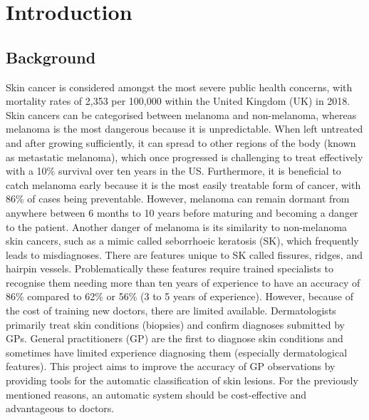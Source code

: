 

\cleardoublepage

\chapter{Introduction}

\section{Background}
Skin cancer is considered amongst the most severe public health concerns, with mortality rates of 2,353 per 100,000 within the United Kingdom (UK) in 2018\cite{UK2019}. Skin cancers can be categorised between melanoma and non-melanoma, whereas melanoma is the most dangerous because it is unpredictable. When left untreated and after growing sufficiently, it can spread to other regions of the body (known as metastatic melanoma), which once progressed is challenging to treat effectively with a 10\% survival over ten years in the US\cite{bhatia2009}. Furthermore, it is beneficial to catch melanoma early because it is the most easily treatable form of cancer, with 86\% of cases being preventable\cite{UK2019}. However, melanoma can remain dormant from anywhere between 6 months to 10 years before maturing and becoming a danger to the patient\cite{UK2019}. Another danger of melanoma is its similarity to non-melanoma skin cancers, such as a mimic called seborrhoeic keratosis (SK), which frequently leads to misdiagnoses\cite{Izikson2002}. There are features unique to SK called fissures, ridges, and hairpin vessels\cite{Minagawa2017}. Problematically these features require trained specialists to recognise them needing more than ten years of experience to have an accuracy of 86\% compared to 62\% or 56\% (3 to 5 years of experience)\cite{Morton1998}. However, because of the cost of training new doctors, there are limited available. Dermatologists primarily treat skin conditions (biopsies) and confirm diagnoses submitted by GPs. General practitioners (GP) are the first to diagnose skin conditions and sometimes have limited experience diagnosing them (especially dermatological features). This project aims to improve the accuracy of GP observations by providing tools for the automatic classification of skin lesions. For the previously mentioned reasons, an automatic system should be cost-effective and advantageous to doctors.


